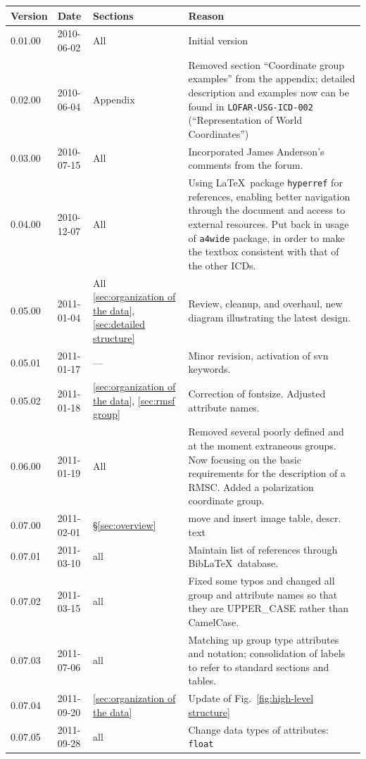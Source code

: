 \documentclass[a4paper,10pt,bibtotoc]{scrartcl}
\begin{document}
\begin{tabular}{lllp{10cm}}
  \hline
  \sc Version & \sc Date & \sc Sections & \sc Reason \\
  \hline \hline
  0.01.00  & 2010-06-02 & All & Initial version \\
  0.02.00  & 2010-06-04 & Appendix & Removed section ``Coordinate group examples''
  from the appendix; detailed description and examples now can be found in
  \texttt{LOFAR-USG-ICD-002} (``Representation of World Coordinates'') \\
  0.03.00 & 2010-07-15 & All & Incorporated James Anderson's comments from the
  forum. \\
  0.04.00 & 2010-12-07 & All & Using \LaTeX\ package \texttt{hyperref} for
  references, enabling better navigation through the document and access to
  external resources. Put back in usage of \texttt{a4wide} package, in order to
  make the textbox consistent with that of the other ICDs. \\
  0.05.00 & 2011-01-04 & All \ref{sec:organization of the data}, \ref{sec:detailed structure} &
  Review, cleanup, and overhaul, new diagram illustrating the latest design. \\
  0.05.01 & 2011-01-17 & --- & Minor revision, activation of svn keywords. \\
  0.05.02 & 2011-01-18 & \ref{sec:organization of the data}, \ref{sec:rmsf group} & Correction
  of fontsize. Adjusted attribute names. \\
  0.06.00 & 2011-01-19 & All & Removed several poorly defined and at the moment extraneous groups. Now focusing on the basic requirements for the description of a RMSC. Added a polarization coordinate group. \\
  0.07.00 & 2011-02-01 & \S \ref{sec:overview} & move and insert image table, descr. text\\
  0.07.01 & 2011-03-10 & all & Maintain list of references through Bib\LaTeX\ database. \\ 
  0.07.02 & 2011-03-15 & all & Fixed some typos and changed all group and attribute names so that they are UPPER\_CASE rather than CamelCase. \\
  0.07.03 & 2011-07-06 & all & Matching up group type attributes and
  notation; consolidation of labels to refer to standard sections
  and tables. \\
  0.07.04 & 2011-09-20 & \ref{sec:organization of the data} & Update of
  Fig.~\ref{fig:high-level structure} \\
  0.07.05 & 2011-09-28 & all & Change data types of attributes: \verb|float|

\end{tabular}
\end{document}
